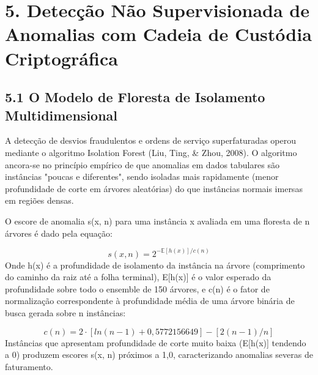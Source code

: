 \documentclass[10pt,a4paper,journal]{article}
\begin{document}
\section{5. Detecção Não Supervisionada de Anomalias com Cadeia de Custódia Criptográfica}
\subsection{5.1 O Modelo de Floresta de Isolamento Multidimensional}
A detecção de desvios fraudulentos e ordens de serviço superfaturadas operou mediante o algoritmo Isolation Forest (Liu, Ting, \& Zhou, 2008). O algoritmo ancora-se no princípio empírico de que anomalias em dados tabulares são instâncias "poucas e diferentes", sendo isoladas mais rapidamente (menor profundidade de corte em árvores aleatórias) do que instâncias normais imersas em regiões densas.

O escore de anomalia s(x, n) para uma instância x avaliada em uma floresta de n árvores é dado pela equação:

\begin{equation}
s(x, n) = 2^{- \mathbb{E}[h(x)] / c(n)} \label{eq:6}
\end{equation}
Onde h(x) é a profundidade de isolamento da instância na árvore (comprimento do caminho da raiz até a folha terminal), E[h(x)] é o valor esperado da profundidade sobre todo o ensemble de 150 árvores, e c(n) é o fator de normalização correspondente à profundidade média de uma árvore binária de busca gerada sobre n instâncias:

\begin{equation}
c(n) = 2 \cdot [ ln(n - 1) + 0,5772156649 ] - [ 2(n - 1) / n ] \label{eq:7}
\end{equation}
Instâncias que apresentam profundidade de corte muito baixa (E[h(x)] tendendo a 0) produzem escores s(x, n) próximos a 1,0, caracterizando anomalias severas de faturamento.
\end{document}
